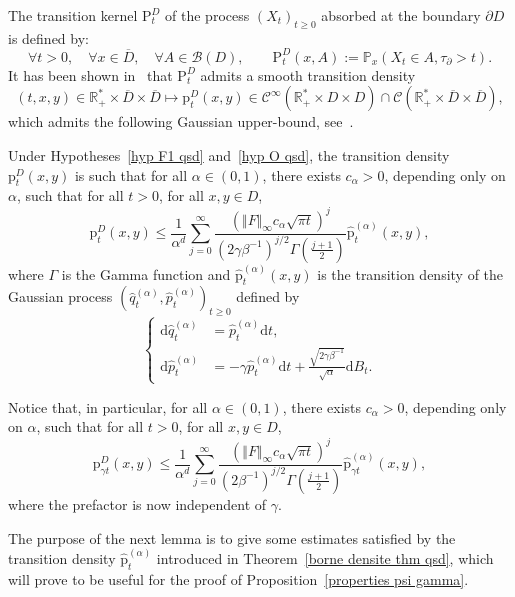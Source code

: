 \documentclass[preprint,EJP]{ejpecp}
\begin{document}
 The transition kernel $\mathrm{P}^D_t$ of the process $(X_t)_{t\geq0}$ absorbed at the boundary $\partial D$ is defined by:
$$\forall t>0, \quad \forall x\in \overline{D}, \quad \forall A\in\mathcal{B}(D), \qquad \mathrm{P}^D_t(x,A):=\mathbb{P}_x(X_t\in A,\tau_\partial>t).$$
It has been shown in~\cite[Theorem 2.20]{LelRamRey} that $\mathrm{P}^D_t$ admits a smooth transition density 
$$(t,x,y)\in\mathbb{R}_+^*\times\overline{D}\times\overline{D}\mapsto\mathrm{p}^D_t(x,y)\in\mathcal{C}^\infty(\mathbb{R}_+^*\times D\times D)\cap\mathcal{C}(\mathbb{R}_+^*\times\overline{D}\times\overline{D}),$$ which admits the following Gaussian upper-bound, see~\cite[Theorem 2.19]{LelRamRey}.

\begin{theorem}\label{borne densite thm qsd}
Under Hypotheses~\ref{hyp F1 qsd} and~\ref{hyp O qsd}, the transition density $\mathrm{p}^D_t(x,y)$ is such that for all $\alpha\in (0,1)$, there exists $c_\alpha>0$, depending only on $\alpha$, such that for all $t>0$, for all $x,y\in D$,
\begin{equation} \label{borne densité qsd}
    \mathrm{p}^D_t(x,y)\leq\frac{1}{\alpha^d} \sum_{j=0}^\infty \frac{\left( \Vert F\Vert_\infty c_\alpha \sqrt{\pi t}  \right)^j}{(2\gamma\beta^{-1})^{j/2} \Gamma\left(\frac{j+1}{2}\right)} \widehat{\mathrm{p}}^{(\alpha)}_{t}(x,y),
\end{equation}
where $\Gamma$ is the Gamma function and
$\widehat{\mathrm{p}}^{(\alpha)}_{t}(x,y)$ is the transition density
of the Gaussian process
 $(\widehat{q}^{(\alpha)}_t, \widehat{p}^{(\alpha)}_t)_{t \geq 0}$ defined by
\begin{equation}\label{eq:processus alpha}
  \left\{\begin{aligned}
    \mathrm{d}\widehat{q}^{(\alpha)}_t &= \widehat{p}^{(\alpha)}_t \mathrm{d}t,\\
    \mathrm{d}\widehat{p}^{(\alpha)}_t &= -\gamma\widehat{p}^{(\alpha)}_t \mathrm{d}t + \frac{\sqrt{2\gamma\beta^{-1}}}{\sqrt{\alpha}}\mathrm{d}B_t.
  \end{aligned}\right.
\end{equation}  
\end{theorem}  
\begin{remark}\label{rk:gaussian ub gamma}
Notice that, in particular, for all $\alpha\in (0,1)$, there exists $c_\alpha>0$, depending only on $\alpha$, such that for all $t>0$, for all $x,y\in D$,
$$\mathrm{p}^D_{\gamma t}(x,y)\leq\frac{1}{\alpha^d} \sum_{j=0}^\infty \frac{\left( \Vert F\Vert_\infty c_\alpha \sqrt{\pi t}  \right)^j}{(2\beta^{-1})^{j/2} \Gamma\left(\frac{j+1}{2}\right)} \widehat{\mathrm{p}}^{(\alpha)}_{\gamma t}(x,y),$$
where the prefactor is now independent of $\gamma$.
\end{remark}
The purpose of the next lemma is to give some estimates satisfied by the transition density $\widehat{\mathrm{p}}^{(\alpha)}_t$ introduced in Theorem~\ref{borne densite thm qsd}, which will prove to be useful for the proof of Proposition~\ref{properties psi gamma}.
\end{document}
